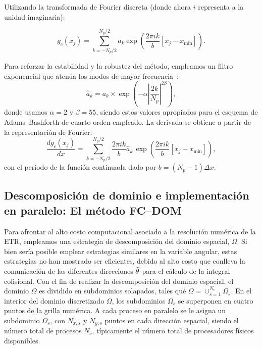 Utilizando la transformada de Fourier discreta (donde ahora $i$ representa a la unidad imaginaria):

\begin{equation}
g_c(x_j)=\sum_{k={-N_p/2}}^{N_p/2}a_k \exp{\left(\frac{2\pi i k}{b} [x_j-x_{\text{min}}]\right)}.
\label{eq:RTEFCSum}
\end{equation}

Para reforzar la estabilidad y la robustez del método, empleamos un filtro exponencial 
que atenúa los modos de mayor frecuencia~\cite{Albin2011}:
\begin{equation}
\hat{a}_k=a_k \times \exp \left(-\alpha \left|\frac{2k}{N_p}\right|^{2\beta}\right) ,
\label{eq:FFilter}
\end{equation}
donde usamos $\alpha=2$ y $\beta=55$, 
siendo estos valores apropiados para el esquema de Adams--Bashforth de cuarto orden empleado.
La derivada se obtiene a partir de la representación de Fourier:
\begin{equation}
\displaystyle \frac{d g_c(x_j)}{dx}=\sum_{k={-N_p/2}}^{N_p/2} \frac{2\pi i k}{b} \hat{a}_k \,  
\exp{\left(\frac{2\pi i k}{b} [x_j-x_{\text{min}}]\right)} ,
\label{eq:RTEFCSumder}
\end{equation}
con el período de la función continuada dado por $b=(N_p-1)\Delta x$.

\subsection{Descomposición de dominio e implementación en paralelo: El método FC--DOM}
\label{subsec:FC-DOM}

Para afrontar al alto costo computacional asociado a la resolución numérica de la ETR,
empleamos una estrategia de descomposición del dominio espacial, $\Omega$. 
Si bien sería posible emplear estrategias similares en la variable angular, 
estas estrategias no han mostrado ser eficientes, debido al alto costo
 que conlleva la comunicación de las diferentes direcciones $\hat{\theta}$ 
 para el cálculo de la integral colisional. 
 Con el fin de realizar la descomposición del dominio espacial, 
 el dominio $\Omega$ es dividido en subdominios solapados, tales qué 
 $\Omega=\cup_{s=1}^{N_{c}}\Omega_s$. 
 En el interior del dominio discretizado $\Omega$, los subdominios $\Omega_s$ se 
 superponen en cuatro puntos de la grilla numérica. 
 A cada proceso en paralelo se le asigna un subdominio $\Omega_s$, 
 con $N_{x,s}$ y $N_{y,s}$ puntos en cada dirección espacial, 
 siendo el número total de procesos $N_c$, típicamente el número 
 total de procesadores físicos disponibles.
 
